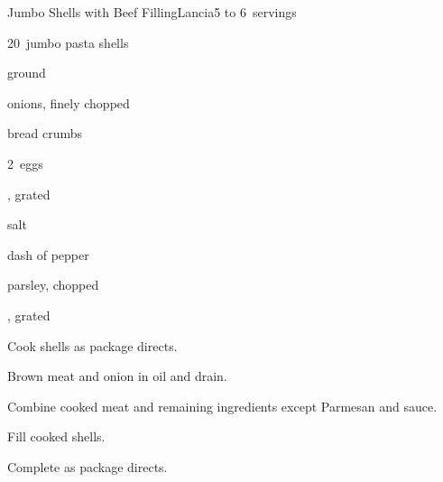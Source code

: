 \begin{recipe}{Jumbo Shells with Beef Filling\FIXME}{Lancia}{5 to 6~servings}

\begin{ingredients}
\item 20~jumbo pasta shells
\item {} ground 
\item \C{\quarter} onions, finely chopped
\item \C{\quarter} bread crumbs
\item 2~eggs
\item {} , grated
\item \tp{\half} salt
\item dash of pepper
\item {} parsley, chopped
\item \C{3\half} 
\item \C{\quarter} , grated
\end{ingredients}

\begin{directions}
\item Cook shells as package directs.
\item Brown meat and onion in oil and drain.
\item Combine cooked meat and remaining ingredients except Parmesan and sauce.
\item Fill cooked shells.
\item Complete as package directs.
\end{directions}

\end{recipe}
